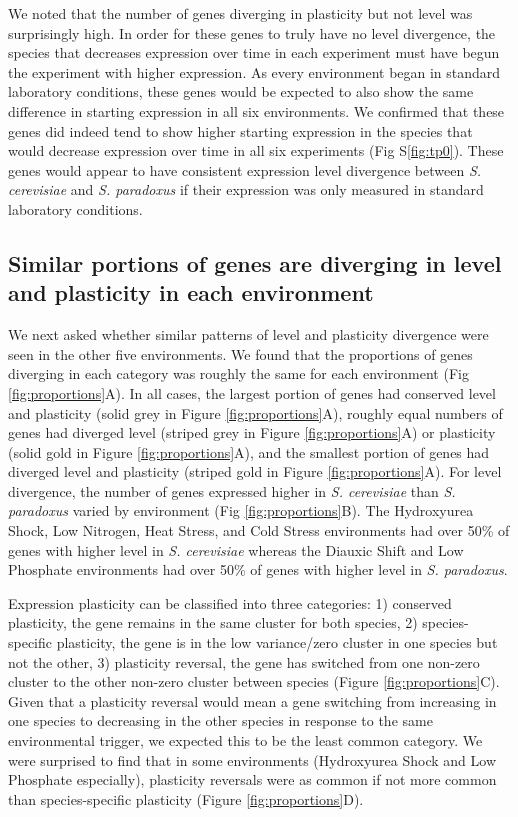 We noted that the number of genes diverging in plasticity but not level was surprisingly high. In order for these genes to truly have no level divergence, the species that decreases expression over time in each experiment must have begun the experiment with higher expression. As every environment began in standard laboratory conditions, these genes would be expected to also show the same difference in starting expression in all six environments. We confirmed that these genes did indeed tend to show higher starting expression in the species that would decrease expression over time in all six experiments (Fig S\ref{fig:tp0}). These genes would appear to have consistent expression level divergence between \textit{S. cerevisiae} and \textit{S. paradoxus} if their expression was only measured in standard laboratory conditions.

\subsection{Similar portions of genes are diverging in level and plasticity in each environment}

We next asked whether similar patterns of level and plasticity divergence were seen in the other five environments. We found that the proportions of genes diverging in each category was roughly the same for each environment (Fig \ref{fig:proportions}A). In all cases, the largest portion of genes had conserved level and plasticity (solid grey in Figure \ref{fig:proportions}A), roughly equal numbers of genes had diverged level (striped grey in Figure \ref{fig:proportions}A) or plasticity (solid gold in Figure \ref{fig:proportions}A), and the smallest portion of genes had diverged level and plasticity (striped gold in Figure \ref{fig:proportions}A). For level divergence, the number of genes expressed higher in \textit{S. cerevisiae} than \textit{S. paradoxus} varied by environment (Fig \ref{fig:proportions}B). The Hydroxyurea Shock, Low Nitrogen, Heat Stress, and Cold Stress environments had over 50\% of genes with higher level in \textit{S. cerevisiae} whereas the Diauxic Shift and Low Phosphate environments had over 50\% of genes with higher level in \textit{S. paradoxus}.

Expression plasticity can be classified into three categories: 1) conserved plasticity, the gene remains in the same cluster for both species, 2) species-specific plasticity, the gene is in the low variance/zero cluster in one species but not the other, 3) plasticity reversal, the gene has switched from one non-zero cluster to the other non-zero cluster between species (Figure \ref{fig:proportions}C). Given that a plasticity reversal would mean a gene switching from increasing in one species to decreasing in the other species in response to the same environmental trigger, we expected this to be the least common category. We were surprised to find that in some environments (Hydroxyurea Shock and Low Phosphate especially), plasticity reversals were as common if not more common than species-specific plasticity (Figure \ref{fig:proportions}D).

